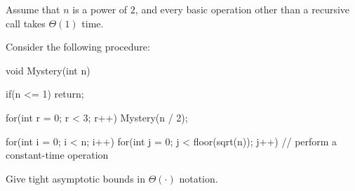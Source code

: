 
Assume that $n$ is a power of $2$, and every basic operation other than a
recursive call takes $\Theta(1)$ time.

Consider the following procedure:

\begin{cpp}
void Mystery(int n){
    if(n <= 1) return;

    for(int r = 0; r < 3; r++){
        Mystery(n / 2);
    }

    for(int i = 0; i < n; i++){
        for(int j = 0; j < floor(sqrt(n)); j++){
            // perform a constant-time operation
        }
    }
}
\end{cpp}

Give tight asymptotic bounds in $\Theta(\cdot)$ notation.

